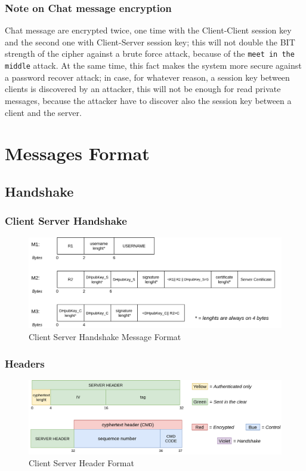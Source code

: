 \documentclass[11pt]{report}
\begin{document}
\subsection*{Note on Chat message encryption }
Chat message are encrypted twice, one time with the Client-Client session key and 
the second one with Client-Server session key; this will not double the BIT strength of the cipher against 
a brute force attack, because of the \texttt{meet in the middle} attack. 
At the same time, this fact makes the system more secure against a password recover attack; in case, for
whatever reason, a session key between clients is discovered by an attacker, this will not be enough for read private messages,
because the attacker have to discover also the session key between a client and the server.

\chapter{Messages Format}

\section{Handshake}
\subsection*{Client Server Handshake}
\begin{figure}[H]
	\centering
	\includegraphics[scale=0.28]{img/AuthClientServer_messageFormat.png}
	\caption{Client Server Handshake Message Format}
	\label {img: FormatClientServer}
\end{figure}
\subsection*{Headers}
\begin{figure}[H]
	\centering
	\includegraphics[scale=0.24]{img/HeaderFormat.png}
	\caption{Client Server Header Format}
	\label {img: FormatClientServerHeader}
\end{figure}
\end{document}
